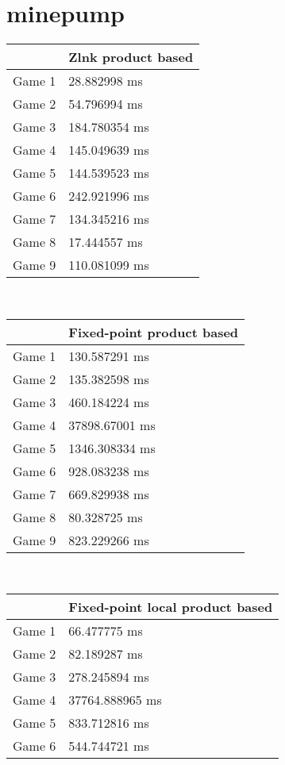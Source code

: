 \small
\section{minepump}
\begin{multicols}{2}
\begin{tabular}{|l|l|}
	\hline
	& Zlnk product based \\ \hline
	Game 1 & 28.882998 ms \\ \hline
	Game 2 & 54.796994 ms \\ \hline
	Game 3 & 184.780354 ms \\ \hline
	Game 4 & 145.049639 ms \\ \hline
	Game 5 & 144.539523 ms \\ \hline
	Game 6 & 242.921996 ms \\ \hline
	Game 7 & 134.345216 ms \\ \hline
	Game 8 & 17.444557 ms \\ \hline
	Game 9 & 110.081099 ms \\ \hline
\end{tabular}\\
\begin{tabular}{|l|l|}
	\hline
	& Fixed-point product based \\ \hline
	Game 1 & 130.587291 ms \\ \hline
	Game 2 & 135.382598 ms \\ \hline
	Game 3 & 460.184224 ms \\ \hline
	Game 4 & 37898.67001 ms \\ \hline
	Game 5 & 1346.308334 ms \\ \hline
	Game 6 & 928.083238 ms \\ \hline
	Game 7 & 669.829938 ms \\ \hline
	Game 8 & 80.328725 ms \\ \hline
	Game 9 & 823.229266 ms \\ \hline
\end{tabular}\\
\begin{tabular}{|l|l|}
	\hline
	& Fixed-point local product based \\ \hline
	Game 1 & 66.477775 ms \\ \hline
	Game 2 & 82.189287 ms \\ \hline
	Game 3 & 278.245894 ms \\ \hline
	Game 4 & 37764.888965 ms \\ \hline
	Game 5 & 833.712816 ms \\ \hline
	Game 6 & 544.744721 ms \\ \hline

\end{tabular}
\end{multicols}

